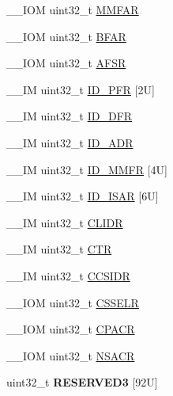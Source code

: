 \begin{DoxyCompactItemize}
\item 
\+\_\+\+\_\+\+I\+OM uint32\+\_\+t \mbox{\hyperlink{struct_s_c_b___type_ae9d94d186615d57d38c9253cb842d244}{M\+M\+F\+AR}}
\item 
\+\_\+\+\_\+\+I\+OM uint32\+\_\+t \mbox{\hyperlink{struct_s_c_b___type_a3fde073744418e2fe476333cb4d55d0d}{B\+F\+AR}}
\item 
\+\_\+\+\_\+\+I\+OM uint32\+\_\+t \mbox{\hyperlink{struct_s_c_b___type_a3ef0057e48fdef798f2ee12125a80d9f}{A\+F\+SR}}
\item 
\+\_\+\+\_\+\+IM uint32\+\_\+t \mbox{\hyperlink{struct_s_c_b___type_a294fd7c7494a55a8f25b0a6333939473}{I\+D\+\_\+\+P\+FR}} \mbox{[}2\+U\mbox{]}
\item 
\+\_\+\+\_\+\+IM uint32\+\_\+t \mbox{\hyperlink{struct_s_c_b___type_a883f7e28417c51d3a3bf03185baf448f}{I\+D\+\_\+\+D\+FR}}
\item 
\+\_\+\+\_\+\+IM uint32\+\_\+t \mbox{\hyperlink{struct_s_c_b___type_a394a63fd0c3f9d7a52d7b220e31a2ef4}{I\+D\+\_\+\+A\+DR}}
\item 
\+\_\+\+\_\+\+IM uint32\+\_\+t \mbox{\hyperlink{struct_s_c_b___type_a2337a27929a11c9ef8d3ec77cf12255a}{I\+D\+\_\+\+M\+M\+FR}} \mbox{[}4\+U\mbox{]}
\item 
\+\_\+\+\_\+\+IM uint32\+\_\+t \mbox{\hyperlink{struct_s_c_b___type_ae6615f4da8c7691bf3b474f70f29a43c}{I\+D\+\_\+\+I\+S\+AR}} \mbox{[}6\+U\mbox{]}
\item 
\+\_\+\+\_\+\+IM uint32\+\_\+t \mbox{\hyperlink{struct_s_c_b___type_a40b4dc749a25d1c95c2125e88683a591}{C\+L\+I\+DR}}
\item 
\+\_\+\+\_\+\+IM uint32\+\_\+t \mbox{\hyperlink{struct_s_c_b___type_aad937861e203bb05ae22c4369c458561}{C\+TR}}
\item 
\+\_\+\+\_\+\+IM uint32\+\_\+t \mbox{\hyperlink{struct_s_c_b___type_a90c793639fc9470e50e4f4fc4b3464da}{C\+C\+S\+I\+DR}}
\item 
\+\_\+\+\_\+\+I\+OM uint32\+\_\+t \mbox{\hyperlink{struct_s_c_b___type_ae627674bc3ccfc2d67caccfc1f4ea4ed}{C\+S\+S\+E\+LR}}
\item 
\+\_\+\+\_\+\+I\+OM uint32\+\_\+t \mbox{\hyperlink{struct_s_c_b___type_ab8e9dd6ca5f31244ea352ed0c19155d8}{C\+P\+A\+CR}}
\item 
\+\_\+\+\_\+\+I\+OM uint32\+\_\+t \mbox{\hyperlink{struct_s_c_b___type_a3b7fa817ab498ce63563c73ae316c9b6}{N\+S\+A\+CR}}
\item 
\mbox{\label{struct_s_c_b___type_a605e2c2287a3d6efd274b9ba3e5d1253}} 
uint32\+\_\+t {\bfseries R\+E\+S\+E\+R\+V\+E\+D3} \mbox{[}92\+U\mbox{]}

\end{DoxyCompactItemize}
